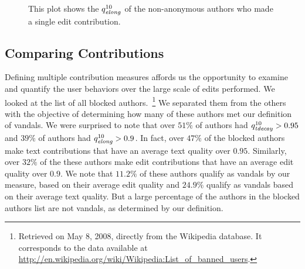 \begin{figure}[tbph]
    \begin{center}
    \end{center}
    \caption[Edit quality of authors with one edit]{
        This plot shows the $\quality{elong}{10}{}$ of the
	non-anonymous authors who made a single edit contribution.
    }
    \label{fig-singles-quality}
\end{figure}






\subsection{Comparing Contributions}

Defining multiple contribution measures affords us
the opportunity to examine and quantify the
user behaviors over the large scale of edits performed.
We looked at the list of all blocked authors.~\footnote{Retrieved
on May 8, 2008, directly from the Wikipedia database.
It corresponds to the data available at
\url{http://en.wikipedia.org/wiki/Wikipedia:List_of_banned_users}.}
We separated them from the others with the objective of determining
how many of these authors met our definition of vandals.
We were surprised to note that over $51\%$ of authors had
$\quality{tdecay}{10}{} > 0.95$ and $39\%$ of authors had
$\quality{elong}{10}{} > 0.9$.
In fact, over $47\%$ of the blocked authors make text contributions
that have an average text quality over $0.95$.
Similarly, over $32\%$ of the these authors make edit contributions
that have an average edit quality over $0.9$.
We note that $11.2\%$ of these authors qualify as vandals by our measure,
based on their average edit quality and $24.9\%$ qualify as vandals
based on their average text quality.
But a large percentage of the authors in the blocked authors
list are not vandals, as determined by our definition.

